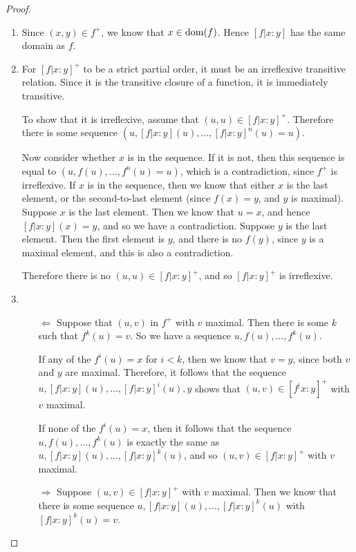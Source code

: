\begin{proof}
\begin{enumerate}
\item 
Since $(x,y) \in f^+$, we know that $x \in \mbox{dom}({f})$. Hence $[f|x:y]$
has the same domain as $f$. 

\item 
For $[f|x:y]^+$ to be a strict partial order, it must be an
irreflexive transitive relation.  Since it is the transitive closure
of a function, it is immediately transitive. 

To show that it is irreflexive, assume that $(u, u) \in
[f|x:y]^+$. Therefore there is some sequence $(u, [f|x:y](u), \ldots,
[f|x:y]^n(u) = u)$.

Now consider whether $x$ is in the sequence. If it is not, then this
sequence is equal to $(u, f(u), \ldots, f^n(u) = u)$, which is a
contradiction, since $f^+$ is irreflexive. If $x$ is in the sequence,
then we know that either $x$ is the last element, or the
second-to-last element (since $f(x) = y$, and $y$ is maximal).
Suppose $x$ is the last element. Then we know that $u = x$, and hence
$[f|x:y](x) = y$, and so we have a contradiction. Suppose $y$ is the
last element. Then the first element is $y$, and there is no $f(y)$,
since $y$ is a maximal element, and this is also a
contradiction. 

Therefore there is no $(u, u) \in [f|x:y]^+$, and so $[f|x:y]^+$ is
irreflexive.

\item
\begin{itemize}
\item[$\Leftarrow$] Suppose that $(u, v)$ in $f^{+}$ with $v$
  maximal. Then there is some $k$ such that $f^k(u) = v$. So we have a
  sequence $u, f(u), \ldots, f^k(u)$.

If any of the $f^i(u) = x$ for $i < k$, then we know that $v = y$,
since both $v$ and $y$ are maximal. Therefore, it follows that the
sequence $u, [f|x:y](u), \ldots, [f|x:y]^i(u), y$ shows that $(u,v)
\in [f^|x:y]^+$ with $v$ maximal.

If none of the $f^i(u) = x$, then it follows that the sequence $u,
f(u), \ldots, f^k(u)$ is exactly the same as $u, [f|x:y](u), \ldots,
[f|x:y]^k(u)$, and so $(u, v) \in [f|x:y]^+$ with $v$ maximal.

\item[$\Rightarrow$] Suppose $(u,v) \in [f|x:y]^{+}$ with $v$
  maximal. Then we know that there is some sequence $u, [f|x:y](u),
  \ldots, [f|x:y]^k(u)$ with $[f|x:y]^k(u) = v$.


\end{itemize}
\end{enumerate}
\end{proof}
